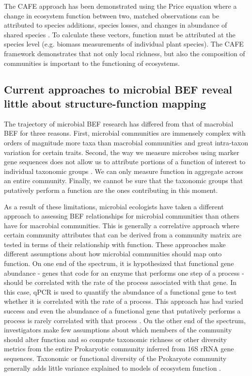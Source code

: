 \documentclass{article}
\begin{document}
The CAFE approach has been demonstrated using the Price equation where a change in ecosystem function between two, matched
observations can be attributed to species additions, species losses, and
changes in abundance of shared species \citep{fox2006,
bannar-martin2018}. To
calculate these vectors, function must be attributed at the species level (e.g.
biomass measurements of individual plant species). The CAFE framework demonstrates
that not only local richness, 
but also the composition of communities is important to the functioning of ecosystems.

\subsection{Current approaches to microbial BEF reveal little about 
structure-function mapping}

The trajectory of microbial BEF research has differed from that of macrobial BEF
for three reasons. First, microbial communities are
immensely complex with orders of magnitude more taxa than macrobial communities
and great intra-taxon variation for certain traits. Second, the way we measure
microbes using marker gene sequences does not allow us to attribute portions of
a function of interest to individual taxonomic groups . We can only
measure function in aggregate across an entire community. Finally, we cannot be
sure that the taxonomic groups that putatively perform a function are the ones
contributing in this moment.

As a result of these limitations, microbial ecologists have taken a different
approach to assessing BEF relationships for microbial communities than others
have for macrobial communities. This is generally a correlative approach where
certain community attributes that can be derived from a community matrix are
tested in terms of their relationship with function. These approaches make
different assumptions about how microbial communities should map onto function.
On one end of the spectrum, it is hypothesized that functional gene abundance - genes that
code for an enzyme that performs one step of a process - should be correlated
with the rate of the process associated with that gene. In this case, qPCR
is used to quantify the abundance of a functional gene to test whether it is
correlated with the rate of a process. This approach has had varied success and even the abundance of a
functional gene that putatively performs a process is rarely correlated with
that process \citep{rocca2015}. On the other end of the
spectrum, investigators make few assumptions about which members of the community should
alter function and so compute
taxonomic richness or other diversity metrics from the entire Prokaryotic
community inferred from 16S rRNA gene sequences. Taxonomic or functional
diversity of the Prokaryote community generally adds little variance explained
to models of ecosystem function \citep{graham2016}.
\end{document}
